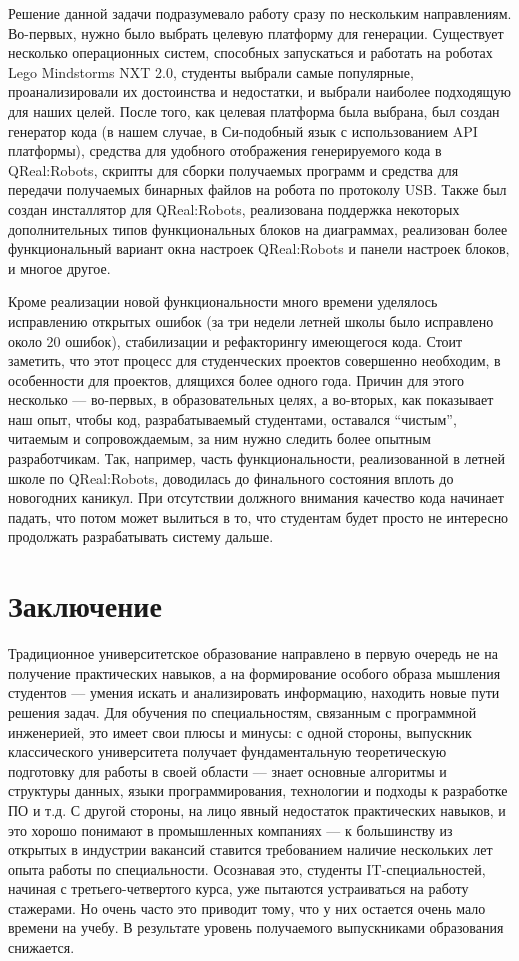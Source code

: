 \documentclass[a4paper]{article}
\begin{document}
Решение данной задачи подразумевало работу сразу по нескольким направлениям. Во-первых, нужно было выбрать целевую платформу для генерации. Существует несколько операционных систем, способных запускаться и работать на роботах Lego Mindstorms NXT 2.0, студенты выбрали самые популярные, проанализировали их достоинства и недостатки, и выбрали наиболее подходящую для наших целей. После того, как целевая платформа была выбрана, был создан генератор кода (в нашем случае, в Си-подобный язык с использованием API платформы), средства для удобного отображения генерируемого кода в QReal:Robots, скрипты для сборки получаемых программ и средства для передачи получаемых бинарных файлов на робота по протоколу USB. Также был создан инсталлятор для QReal:Robots, реализована поддержка некоторых дополнительных типов функциональных блоков на диаграммах, реализован более функциональный вариант окна настроек QReal:Robots и панели настроек блоков,  и многое другое.

Кроме реализации новой функциональности много времени уделялось исправлению открытых ошибок (за три недели летней школы было исправлено около 20 ошибок), стабилизации и рефакторингу имеющегося кода. Стоит заметить, что этот процесс для студенческих проектов совершенно необходим, в особенности для проектов, длящихся более одного года. Причин для этого несколько --- во-первых, в образовательных целях, а во-вторых, как показывает наш опыт, чтобы код, разрабатываемый студентами, оставался ``чистым'', читаемым и сопровождаемым, за ним нужно следить более опытным разработчикам. Так, например, часть функциональности, реализованной в летней школе по QReal:Robots, доводилась до финального состояния вплоть до новогодних каникул. При отсутствии должного внимания качество кода начинает падать, что потом может вылиться в то, что студентам будет просто не интересно продолжать разрабатывать систему дальше. 

\section{Заключение} 

Традиционное университетское образование направлено в первую очередь не на получение практических навыков, а на формирование особого образа мышления студентов --- умения искать и анализировать информацию, находить новые пути решения задач. Для обучения по специальностям, связанным с программной инженерией, это имеет свои плюсы и минусы: с одной стороны, выпускник классического университета получает фундаментальную теоретическую подготовку для работы в своей области --- знает основные алгоритмы и структуры данных, языки программирования, технологии и подходы к разработке ПО и т.д. С другой стороны, на лицо явный недостаток практических навыков, и это хорошо понимают в промышленных компаниях --- к большинству из открытых в индустрии вакансий ставится требованием наличие нескольких лет опыта работы по специальности. Осознавая это, студенты IT-специальностей, начиная с третьего-четвертого курса, уже пытаются устраиваться на работу стажерами. Но очень часто это приводит тому, что у них остается очень мало времени на учебу. В результате уровень получаемого выпускниками образования снижается.
\end{document}
